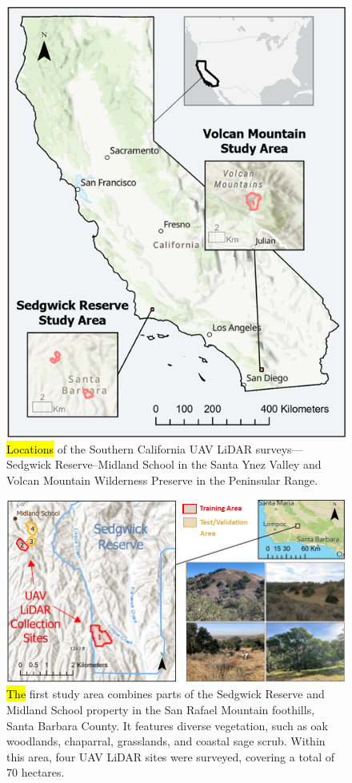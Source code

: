 \documentclass[remotesensing,article,accept,pdftex,moreauthors]{Definitions/mdpi}
\begin{document}
\begin{figure}[H]
  \includegraphics[width=0.75\linewidth]{figures/Overall_Study_Areas_v2.png}
    \caption{\hl{Locations} %
 of the Southern California UAV LiDAR surveys—Sedgwick Reserve–Midland School in the Santa Ynez Valley and Volcan Mountain Wilderness Preserve in the Peninsular Range.}
  \label{fig:overall_study_area}
\end{figure}  
\vspace{-9pt}

\begin{figure}[H]
  \includegraphics[width=0.95\linewidth]{figures/Sedgwick_Reserve_Study_Area.png}
    \caption{\hl{The} %
 first study area combines parts of the Sedgwick Reserve and Midland School property in the San Rafael Mountain foothills, Santa Barbara County. It features diverse vegetation, such as oak woodlands, chaparral, grasslands, and coastal sage scrub. Within this area, four UAV LiDAR sites were surveyed, covering a total of 70 hectares.}
  \label{fig:sedgwick_study_area}
\end{figure} 
\end{document}

